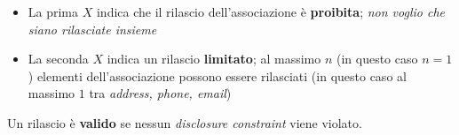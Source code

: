 \documentclass{report}
\begin{document}
\begin{itemize}
    \item La prima $X$ indica che il rilascio dell'associazione è \textbf{proibita}; \textit{non voglio che siano rilasciate insieme}
    \item La seconda $X$ indica un rilascio \textbf{limitato}; al massimo $n$ (in questo caso $n=1$) elementi 
    dell'associazione possono essere rilasciati (in questo caso al massimo $1$ tra \textit{address, phone, email})
\end{itemize}

\noindent Un rilascio è \textbf{valido} se nessun \textit{disclosure constraint} viene violato.  
\end{document}
